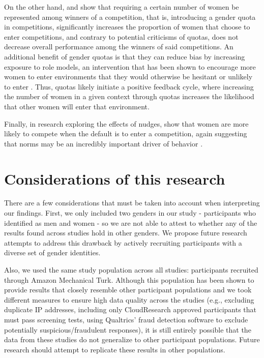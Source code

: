 \documentclass[a4paper, nobind]{templates/ociamthesis}
\begin{document}
On the other hand, \textcite{Niederle2013} and \textcite{Balafoutas2012} show that requiring a certain number of women be represented among winners of a competition, that is, introducing a gender quota in competitions, significantly increases the proportion of women that choose to enter competitions, and contrary to potential criticisms of quotas, does not decrease overall performance among the winners of said competitions. An additional benefit of gender quotas is that they can reduce bias by increasing exposure to role models, an intervention that has been shown to encourage more women to enter environments that they would otherwise be hesitant or unlikely to enter \autocite{Porter2020,Busso2021,Carpio2021,Boneva2021,Ginther2020,Breda2021}. Thus, quotas likely initiate a positive feedback cycle, where increasing the number of women in a given context through quotas increases the likelihood that other women will enter that environment.

Finally, in research exploring the effects of nudges, \textcite{He2021} show that women are more likely to compete when the default is to enter a competition, again suggesting that norms may be an incredibly important driver of behavior \autocite[also see][]{Erkal2018}.

\hypertarget{considerations-of-this-research}{%
\section{Considerations of this research}\label{considerations-of-this-research}}

There are a few considerations that must be taken into account when interpreting our findings. First, we only included two genders in our study - participants who identified as men and women - so we are not able to attest to whether any of the results found across studies hold in other genders. We propose future research attempts to address this drawback by actively recruiting participants with a diverse set of gender identities.

Also, we used the same study population across all studies: participants recruited through Amazon Mechanical Turk. Although this population has been shown to provide results that closely resemble other participant populations \autocite{Rand2012,Buhrmester2011,Paolacci2014,Chandler2016} and we took different measures to ensure high data quality across the studies (e.g., excluding duplicate IP addresses, including only CloudResearch approved participants that must pass screening tests, using Qualtrics' fraud detection software to exclude potentially suspicious/fraudulent responses), it is still entirely possible that the data from these studies do not generalize to other participant populations. Future research should attempt to replicate these results in other populations.
\end{document}
